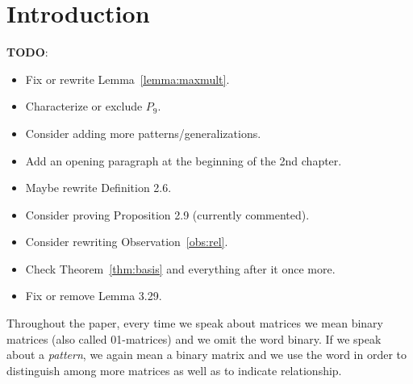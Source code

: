 \chapter*{Introduction}
\textbf{TODO}:
\begin{itemize}
	\item Fix or rewrite Lemma~\ref{lemma:maxmult}.
	\item Characterize or exclude $P_9$.
	\item Consider adding more patterns/generalizations.
	\item Add an opening paragraph at the beginning of the 2nd chapter.
	\item Maybe rewrite Definition 2.6.
	\item Consider proving Proposition 2.9 (currently commented).
	\item Consider rewriting Observation~\ref{obs:rel}.
	\item Check Theorem~\ref{thm:basis} and everything after it once more.
	\item Fix or remove Lemma 3.29.
\end{itemize}

Throughout the paper, every time we speak about matrices we mean binary matrices (also called 01-matrices) and we omit the word binary. If we speak about a \emph{pattern}, we again mean a binary matrix and we use the word in order to distinguish among more matrices as well as to indicate relationship.

